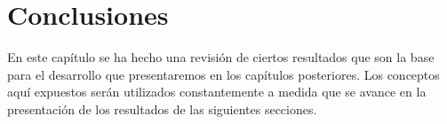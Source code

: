\section{Conclusiones}
En este cap\'itulo se ha hecho una revisi\'on de ciertos resultados que son la base para el desarrollo que presentaremos en los cap\'itulos posteriores. Los conceptos aqu\'i expuestos ser\'an utilizados constantemente a medida que se avance en la presentaci\'on de los resultados de las siguientes secciones.